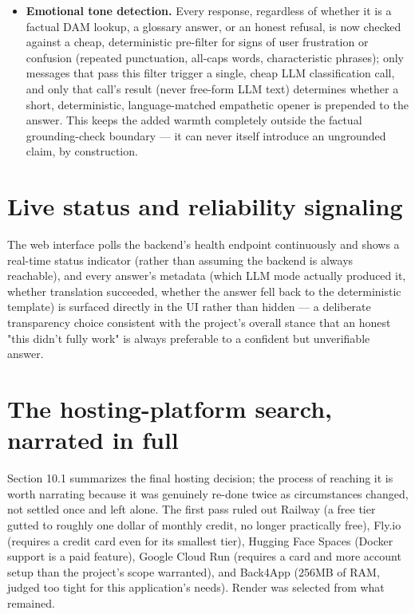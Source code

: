 \begin{itemize}
\item \textbf{Emotional tone detection.} Every response, regardless of whether it is a factual DAM lookup, a glossary answer, or an honest refusal, is now checked against a cheap, deterministic pre-filter for signs of user frustration or confusion (repeated punctuation, all-caps words, characteristic phrases); only messages that pass this filter trigger a single, cheap LLM classification call, and only that call's result (never free-form LLM text) determines whether a short, deterministic, language-matched empathetic opener is prepended to the answer. This keeps the added warmth completely outside the factual grounding-check boundary — it can never itself introduce an ungrounded claim, by construction.
\end{itemize}
\section{Live status and reliability signaling}
The web interface polls the backend's health endpoint continuously and shows a real-time status indicator (rather than assuming the backend is always reachable), and every answer's metadata (which LLM mode actually produced it, whether translation succeeded, whether the answer fell back to the deterministic template) is surfaced directly in the UI rather than hidden — a deliberate transparency choice consistent with the project's overall stance that an honest "this didn't fully work" is always preferable to a confident but unverifiable answer.

\section{The hosting-platform search, narrated in full}
Section 10.1 summarizes the final hosting decision; the process of reaching it is worth narrating because it was genuinely re-done twice as circumstances changed, not settled once and left alone. The first pass ruled out Railway (a free tier gutted to roughly one dollar of monthly credit, no longer practically free), Fly.io (requires a credit card even for its smallest tier), Hugging Face Spaces (Docker support is a paid feature), Google Cloud Run (requires a card and more account setup than the project's scope warranted), and Back4App (256MB of RAM, judged too tight for this application's needs). Render was selected from what remained.

